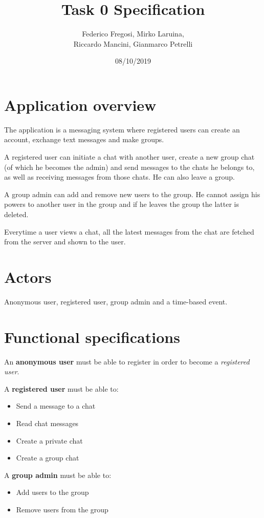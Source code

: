 \documentclass[titlepage, 12pt]{article}
\title{Task 0 Specification}
\date{08/10/2019}
\author{Federico Fregosi, Mirko Laruina, \\Riccardo Mancini, Gianmarco Petrelli}
\begin{document}
\maketitle

\section{Application overview}
The application is a messaging system where registered users can create an 
account, exchange text messages and make groups.

A registered user can initiate a chat with another user, create a new group chat
(of which he becomes the admin) and send messages to the chats he belongs to,
as well as receiving messages from those chats. He can also leave a group.

A group admin can add and remove new users to the group. He cannot assign his
powers to another user in the group and if he leaves the group the latter 
is deleted.

Everytime a user views a chat, all the latest messages from the chat are 
fetched from the server and shown to the user.

\section{Actors}
Anonymous user, registered user, group admin and a time-based event.

\section{Functional specifications}
An \textbf{anonymous user} must be able to register in order to become a 
\emph{registered user}.

A \textbf{registered user} must be able to:
\begin{itemize}
    \item Send a message to a chat
    \item Read chat messages
    \item Create a private chat
    \item Create a group chat
\end{itemize}

A \textbf{group admin} must be able to:
\begin{itemize}
    \item Add users to the group
    \item Remove users from the group
\end{itemize}
\end{document}
